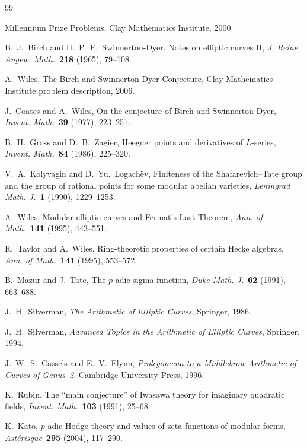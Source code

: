 \documentclass[12pt]{article}
\theoremstyle{plain}
\theoremstyle{definition}
\begin{document}

\begin{thebibliography}{99}

Millennium Prize Problems, Clay Mathematics Institute, 2000.

B.~J.~Birch and H.~P.~F.~Swinnerton-Dyer,
Notes on elliptic curves II,
\emph{J. Reine Angew. Math.}\ \textbf{218} (1965), 79--108.

A.~Wiles,
The Birch and Swinnerton-Dyer Conjecture,
Clay Mathematics Institute problem description, 2006.

J.~Coates and A.~Wiles,
On the conjecture of Birch and Swinnerton-Dyer,
\emph{Invent. Math.}\ \textbf{39} (1977), 223--251.

B.~H.~Gross and D.~B.~Zagier,
Heegner points and derivatives of $L$-series,
\emph{Invent. Math.}\ \textbf{84} (1986), 225--320.

V.~A.~Kolyvagin and D.~Yu.~Logach\"ev,
Finiteness of the Shafarevich--Tate group and the group of
rational points for some modular abelian varieties,
\emph{Leningrad Math. J.}\ \textbf{1} (1990), 1229--1253.

A.~Wiles,
Modular elliptic curves and Fermat's Last Theorem,
\emph{Ann. of Math.}\ \textbf{141} (1995), 443--551.

R.~Taylor and A.~Wiles,
Ring-theoretic properties of certain Hecke algebras,
\emph{Ann. of Math.}\ \textbf{141} (1995), 553--572.

B.~Mazur and J.~Tate,
The $p$-adic sigma function,
\emph{Duke Math. J.}\ \textbf{62} (1991), 663--688.

J.~H.~Silverman,
\emph{The Arithmetic of Elliptic Curves},
Springer, 1986.

J.~H.~Silverman,
\emph{Advanced Topics in the Arithmetic of Elliptic Curves},
Springer, 1994.

J.~W.~S.~Cassels and E.~V.~Flynn,
\emph{Prolegomena to a Middlebrow Arithmetic of Curves of Genus~2},
Cambridge University Press, 1996.

K.~Rubin,
The ``main conjecture'' of Iwasawa theory for imaginary quadratic
fields,
\emph{Invent. Math.}\ \textbf{103} (1991), 25--68.

K.~Kato,
$p$-adic Hodge theory and values of zeta functions of modular forms,
\emph{Ast\'erisque}\ \textbf{295} (2004), 117--290.


\end{thebibliography}
\end{document}
